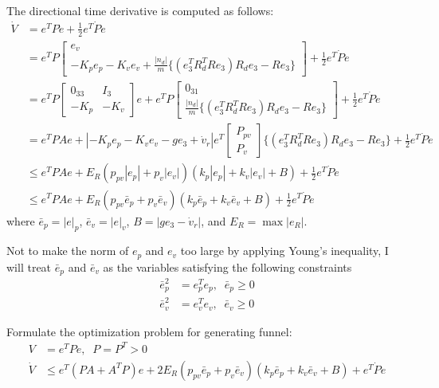 \documentclass{article}
\begin{document}
The directional time derivative is computed as follows:
\begin{align}
\dot{V} &= e^TP\dot{e} +\frac{1}{2}e^T\dot{P}e\nonumber \\
&= e^TP\left[
\begin{array}{l}
e_v \\ -K_pe_p -K_ve_v + \frac{|n_d|}{m}\{(e_3^TR_d^TRe_3)R_de_3-Re_3\} 
\end{array}
\right] +\frac{1}{2}e^T\dot{P}e\nonumber \\
&= e^TP\left[
\begin{array}{cc}
0_{33} & I_3 \\ -K_p & -K_v
\end{array}
\right]e + 
e^TP\left[
\begin{array}{c}
0_{31} \\ \frac{|n_d|}{m}\{(e_3^TR_d^TRe_3)R_de_3-Re_3\} 
\end{array}
\right] +\frac{1}{2}e^T\dot{P}e\nonumber \\
&= e^TPAe + |-K_p e_p -K_v e_v - ge_3 + \dot{v}_r|e^T
\left[
\begin{array}{c}
P_{pv} \\ P_v
\end{array}
\right]
\{(e_3^TR_d^TRe_3)R_de_3-Re_3\} +\frac{1}{2}e^T\dot{P}e\nonumber \\
&\leq e^TPAe+ E_R(p_{pv}|e_p|+p_v|e_v|)(k_p|e_p|+k_v|e_v|+B)+\frac{1}{2}e^T\dot{P}e \nonumber  \\
&\leq e^TPAe+ E_R(p_{pv}\bar{e}_p+p_v\bar{e}_v)(k_p\bar{e}_p+k_v\bar{e}_v+B)+\frac{1}{2}e^T\dot{P}e \nonumber
\end{align}
where $\bar{e}_p = |e|_p$, $\bar{e}_v = |e|_v$, $B = |ge_3-\dot{v}_r|$, and $E_R = \max|e_R|$.

Not to make the norm of $e_p$ and $e_v$ too large by applying Young's inequality, I will treat $\bar{e}_p$ and $\bar{e}_v$ as the variables satisfying the following constraints
\begin{align}
\bar{e}_p^2 &= e_p^Te_p,\;\;\bar{e}_p \geq 0 \nonumber \\
\bar{e}_v^2 &= e_v^Te_v,\;\;\bar{e}_v \geq 0 \nonumber
\end{align}

Formulate the optimization problem for generating funnel:
\begin{align}
V &= e^TPe,\;\;P = P^T >0 \nonumber \\
\dot{V} &\leq e^T(PA + A^TP)e+ 2E_R(p_{pv}\bar{e}_p+p_v\bar{e}_v)(k_p\bar{e}_p+k_v\bar{e}_v+B)+e^T\dot{P}e \nonumber
\end{align}
\end{document}
